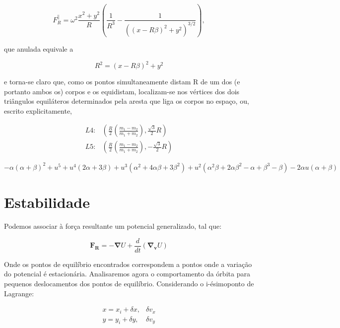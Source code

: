 \begin{equation}
    F_R^\parallel = \omega^2\frac{x^2 + y^2}{R}\left( \frac{1}{R^3} - \frac{1}{((x-R\beta)^2 + y^2)^{3/2}}\right),
\end{equation}

que anulada equivale a

\begin{equation}
    R^2=(x-R\beta)^2+y^2
\end{equation}

e torna-se claro que, como os pontos simultaneamente distam R de um dos (e portanto ambos os) corpos e os equidistam, localizam-se nos vértices dos dois triângulos equiláteros determinados pela aresta que liga os corpos no espaço, ou, escrito explicitamente,

\begin{align}
    L4: & \left(\frac{R}{2}\left(\frac{m_1 - m_2}{m_1 + m_2}\right),\frac{\sqrt{3}}{2}R\right) \\
    L5: & \left(\frac{R}{2}\left(\frac{m_1 - m_2}{m_1 + m_2}\right),-\frac{\sqrt{3}}{2}R\right)
\end{align}

\begin{equation}
    -\alpha  (\alpha +\beta )^2+u^5+u^4 (2 \alpha +3 \beta )+u^3 \left(\alpha ^2+4 \alpha  \beta +3 \beta^2\right)+u^2 \left(\alpha ^2 \beta +2 \alpha  \beta ^2-\alpha +\beta ^3-\beta \right)-2 \alpha  u (\alpha +\beta )
\end{equation}

\section{Estabilidade}

Podemos associar à força resultante um potencial generalizado, tal que:

\begin{equation}
\mathbf{F_R} = \mathbf{-\nabla} U + \frac{d}{dt}(\mathbf{\nabla _v}U)
\end{equation}

Onde os pontos de equilíbrio encontrados correspondem a pontos onde a variação do potencial é estacionária. Analisaremos agora o comportamento da órbita para pequenos deslocamentos dos pontos de equilíbrio. Considerando o i-ésimoponto de Lagrange:

\begin{eqnarray}
x = x_i + \delta x, & \delta v_x \\
y = y_i + \delta y, & \delta v_y
\end{eqnarray}

